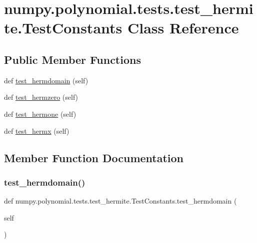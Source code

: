 \hypertarget{classnumpy_1_1polynomial_1_1tests_1_1test__hermite_1_1TestConstants}{}\section{numpy.\+polynomial.\+tests.\+test\+\_\+hermite.\+Test\+Constants Class Reference}
\label{classnumpy_1_1polynomial_1_1tests_1_1test__hermite_1_1TestConstants}
\subsection*{Public Member Functions}
\begin{DoxyCompactItemize}
\item 
def \hyperlink{classnumpy_1_1polynomial_1_1tests_1_1test__hermite_1_1TestConstants_a5ee610ea22234790eb2fb3fdf504e4fa}{test\+\_\+hermdomain} (self)
\item 
def \hyperlink{classnumpy_1_1polynomial_1_1tests_1_1test__hermite_1_1TestConstants_a615add2df084413cdc02bae925c715a7}{test\+\_\+hermzero} (self)
\item 
def \hyperlink{classnumpy_1_1polynomial_1_1tests_1_1test__hermite_1_1TestConstants_ab02f157b64f79100a155c6103c7afd05}{test\+\_\+hermone} (self)
\item 
def \hyperlink{classnumpy_1_1polynomial_1_1tests_1_1test__hermite_1_1TestConstants_a8b7ce774ab7323e438760592dfdc102b}{test\+\_\+hermx} (self)
\end{DoxyCompactItemize}


\subsection{Member Function Documentation}
\mbox{\label{classnumpy_1_1polynomial_1_1tests_1_1test__hermite_1_1TestConstants_a5ee610ea22234790eb2fb3fdf504e4fa}} 
\subsubsection{\texorpdfstring{test\+\_\+hermdomain()}{test\_hermdomain()}}
{\footnotesize\ttfamily def numpy.\+polynomial.\+tests.\+test\+\_\+hermite.\+Test\+Constants.\+test\+\_\+hermdomain (\begin{DoxyParamCaption}\item[{}]{self }\end{DoxyParamCaption})}

